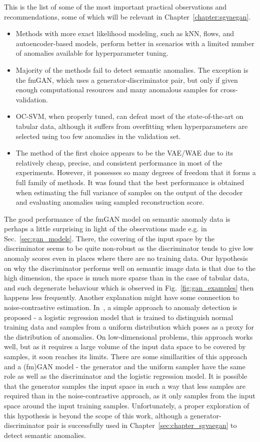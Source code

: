This is the list of some of the most important practical observations and recommendations, some of which will be relevant in Chapter~\ref{chapter:sgvaegan}.
\begin{itemize}
    \item Methods with more exact likelihood modeling, such as kNN, flows, and autoencoder-based models, perform better in scenarios with a limited number of anomalies available for hyperparameter tuning.
    \item Majority of the methods fail to detect semantic anomalies. The exception is the fmGAN, which uses a generator-discriminator pair, but only if given enough computational resources and many anomalous samples for cross-validation.
    \item OC-SVM, when properly tuned, can defeat most of the state-of-the-art on tabular data, although it suffers from overfitting when hyperparameters are selected using too few anomalies in the validation set.
    \item The method of the first choice appears to be the VAE/WAE due to its relatively cheap, precise, and consistent performance in most of the experiments. However, it possesses so many degrees of freedom that it forms a full family of methods. It was found that the best performance is obtained when estimating the full variance of samples on the output of the decoder and evaluating anomalies using sampled reconstruction score. 
\end{itemize}

The good performance of the fmGAN model on semantic anomaly data is perhaps a little surprising in light of the observations made e.g. in Sec.~\ref{sec:gan_models}. There, the covering of the input space by the discriminator seems to be quite non-robust as the discriminator tends to give low anomaly scores even in places where there are no training data. Our hypothesis on why the discriminator performs well on semantic image data is that due to the high dimension, the space is much more sparse than in the case of tabular data, and such degenerate behaviour which is observed in Fig.~\ref{fig:gan_examples} then happens less frequently. Another explanation might have some connection to noise-contrastive estimation. In~\cite{gutmann2010noise}, a simple approach to anomaly detection is proposed - a logistic regression model that is trained to distinguish normal training data and samples from a uniform distribution which poses as a proxy for the distribution of anomalies. On low-dimensional problems, this approach works well, but as it requires a large volume of the input data space to be covered by samples, it soon reaches its limits. There are some simillarities of this approach and a (fm)GAN model - the generator and the uniform sampler have the same role as well as the discriminator and the logistic regression model. It is possible that the generator samples the input space in such a way that less samples are required than in the noise-contrastive approach, as it only samples from the input space around the input training samples. Unfortunately, a proper exploration of this hypothesis is beyond the scope of this work, although a generator-discriminator pair is successfully used in Chapter~\ref{sec:chapter_sgvaegan} to detect semantic anomalies.


